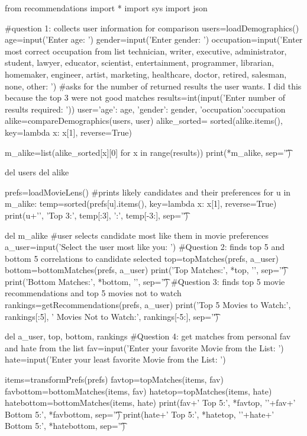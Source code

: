 \documentclass[12pt, letterpaper]{article}
\begin{document}
\begin{MyPython}[caption={Movie\textunderscore Lens.py}, label=lst:MovieLenspy]
from recommendations import *
import sys
import json

#question 1: collects user information for comparison
users=loadDemographics()
age=input('Enter age: ')
gender=input('Enter gender: ')
occupation=input('Enter most correct occupation from list {technician, writer, executive, administrator, student, lawyer, educator, scientist, entertainment, programmer, librarian, homemaker, engineer, artist, marketing, healthcare, doctor, retired, salesman, none, other}: ')
#asks for the number of returned results the user wants. I did this because the top 3 were not good matches
results=int(input('Enter number of results required: '))
user={'age': age, 'gender': gender, 'occupation':occupation}
alike=compareDemographics(users, user)
alike_sorted= sorted(alike.items(), key=lambda x: x[1], reverse=True)

m_alike=list(alike_sorted[x][0] for x in range(results))
print(*m_alike, sep='\t')

del users
del alike

prefs=loadMovieLens()
#prints likely candidates and their preferences
for u in m_alike:
    temp=sorted(prefs[u].items(), key=lambda x: x[1], reverse=True)
    print(u+'\n', 'Top 3:\n', temp[:3], '\n{}:\n', temp[-3:], sep='\t')

del m_alike
#user selects candidate most like them in movie preferences
a_user=input('Select the user most like you: ')
#Question 2: finds top 5 and bottom 5 correlations to candidate selected 
top=topMatches(prefs, a_user)
bottom=bottomMatches(prefs, a_user)
print('Top Matches:\n', *top, '\n', sep='\t')
print('Bottom Matches:\n', *bottom, '\n', sep='\t')
#Question 3: finds top 5 movie recommendations and top 5 movies not to watch
rankings=getRecommendations(prefs, a_user)
print('Top 5 Movies to Watch:\n', rankings[:5], ' Movies Not to Watch:\n', rankings[-5:], sep='\t')

del a_user, top, bottom, rankings
#Question 4: get matches from personal fav and hate from the list
fav=input('Enter your favorite Movie from the List: ')
hate=input('Enter your least favorite Movie from the List: ')

items=transformPrefs(prefs)
favtop=topMatches(items, fav)
favbottom=bottomMatches(items, fav)
hatetop=topMatches(items, hate)
hatebottom=bottomMatches(items, hate)
print(fav+' Top 5:\n', *favtop, '\n'+fav+' Bottom 5:\n', *favbottom, sep='\t')
print(hate+' Top 5:\n', *hatetop, '\n'+hate+' Bottom 5:\n', *hatebottom, sep='\t')
\end{MyPython}
\end{document}
